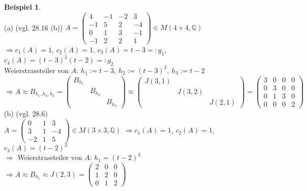 \documentclass[10pt,a4paper,numbers=endperiod]{scrartcl}
\theoremstyle{definition}
\newtheorem{bsp}[satz]{Beispiel}
\def\QQ{{\mathbb Q}}
\begin{document}
\begin{bsp}
	$ $\\
	(a) (vgl. 28.16 (b)) 
	$A = \begin{pmatrix}
	4 & -1 & -2 &3\\
	-1 & 5 & 2 & -4\\
	0 & 1 & 3 & -1\\
	-1 & 2 & 2 & 1
	\end{pmatrix} \in M(4 \times 4, \QQ)$\\
	$\Rightarrow c_1(A) = 1$, $c_2(A) = 1$, $c_3(A) = t-3 =: g_1$, $c_4(A) = (t-3)^2(t-2)=:g_2$\\
	Weierstrassteiler von $A$: $h_1:= t-3$, $h_2:= (t-3)^2$, $h_3 := t-2$\\
	$\Rightarrow A \approx B_{h_1, h_2, h_3} = \begin{pmatrix}
	B_{h_1} & &\\
	& B_{h_2} &\\
	& & B_{h_3}
	\end{pmatrix} \approx \begin{pmatrix}
	J(3,1) & &\\
	& J(3,2) &\\
	& & J(2,1)
	\end{pmatrix} = \begin{pmatrix}
	3 & 0 & 0 & 0\\
	0 & 3 & 0 & 0\\
	0 & 1 & 3 & 0\\
	0 & 0 & 0 & 2
	\end{pmatrix}$\\
	
	(b) (vgl. 28.6)\\
	$A = \begin{pmatrix}
	0 & 1 & 3\\
	3 & 1 & -4\\
	-2 & 1 & 5
	\end{pmatrix} \in M(3 \times 3, \QQ)$ $\Rightarrow c_1(A) = 1$, $c_2(A) = 1$, $c_3(A) = (t-2)^3$\\
	$\Rightarrow$ Weierstrassteiler von $A$: $h_1 = (t-2)^3$\\
	$\Rightarrow A \approx B_{h_1} \approx J(2,3) = \begin{pmatrix}
	2 & 0 & 0\\
	1 & 2 & 0\\
	0 & 1 & 2
	\end{pmatrix}$\\
	

\end{bsp}
\end{document}
